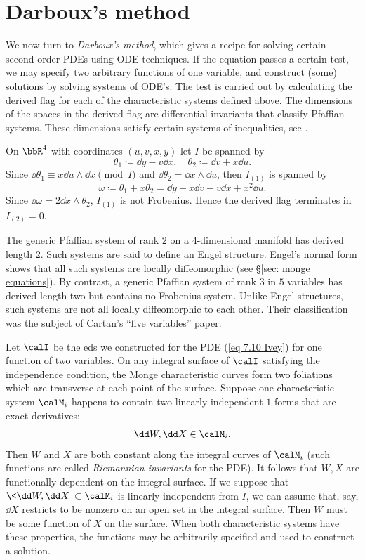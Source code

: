 \section{Darboux's method}

We now turn to \emph{Darboux's method}, which gives a recipe for solving certain second-order PDEs using ODE techniques. If the equation passes a certain test, we may specify two arbitrary functions of one variable, and construct (some) solutions by solving systems of ODE's. The test is carried out by calculating the derived flag for each of the characteristic systems defined above. The dimensions of the spaces in the derived flag are differential invariants that classify Pfaffian systems. These dimensions satisfy certain systems of inequalities, see \cite{Bryant}.

\begin{example}
    On $\bbR^4$ with coordinates $(u,v,x,y)$ let $I$ be spanned by 
    \[\theta_1\coloneqq \dd y-v\dd x,\quad \theta_2\coloneqq \dd v+x\dd u.\]
    Since $\dd\theta_1\equiv x\dd u\wedge \dd x\pmod{I}$ and $\dd\theta_2=\dd x\wedge\dd u$, then $I_{(1)}$ is spanned by 
    \[\omega\coloneqq \theta_1+x\theta_2=\dd y+x\dd v-v \dd x+x^2\dd u.\]
    Since $\dd\omega=2\dd x\wedge\theta_2$, $I_{(1)}$ is not Frobenius. Hence the derived flag terminates in $I_{(2)}=0$.
\end{example}

The generic Pfaffian system of rank $2$ on a $4$-dimensional manifold has derived length $2$. Such systems are said to define an Engel structure. Engel's normal form shows that all such systems are locally diffeomorphic (see \S\ref{sec: monge equations}). By contrast, a generic Pfaffian system of rank $3$ in $5$ variables has derived length two but contains no Frobenius system. Unlike Engel structures, such systems are not all locally diffeomorphic to each other. Their classification was the subject of Cartan's ``five variables'' paper. 

Let $\calI$ be the \gls{eds} we constructed for the PDE (\ref{eq 7.10 Ivey}) for one function of two variables. On any integral surface of $\calI$ satisfying the independence condition, the Monge characteristic curves form two foliations which are transverse at each point of the surface. Suppose one characteristic system $\calM_i$ happens to contain two linearly independent $1$-forms that are exact derivatives:
\[\dd W,\dd X\in\calM_i.\]
Then $W$ and $X$ are both constant along the integral curves of $\calM_i$ (such functions are called \emph{Riemannian invariants} for the PDE). It follows that $W,X$ are functionally dependent on the integral surface. If we suppose that $\<\dd W,\dd X\>\subset \calM_i$ is linearly independent from $I$, we can assume that, say, $\dd X$ restricts to be nonzero on an open set in the integral surface. Then $W$ must be some function of $X$ on the surface. When both characteristic systems have these properties, the functions may be arbitrarily specified and used to construct a solution.


